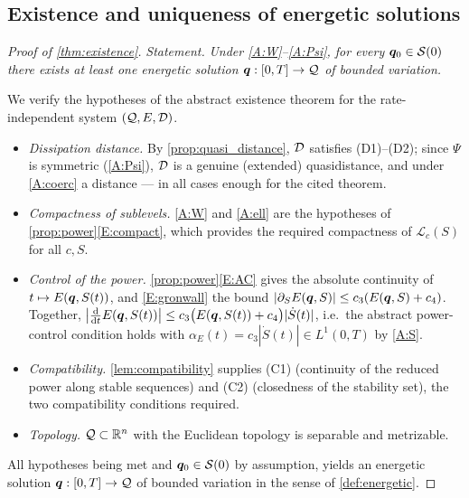 \subsection{Existence and uniqueness of energetic solutions}

\begin{proof}[Proof of \cref{thm:existence}]
\emph{Statement.} \emph{Under \ref{A:W}--\ref{A:Psi}, for every
$\bm{q}_0\in\mathcal S(0)$ there exists at least one energetic solution
$\bm{q}:[0,T]\to\mathcal{Q}$ of bounded variation.}

\smallskip
We verify the hypotheses of the abstract existence theorem
\cite[Thm.~2.1.6]{MielkeRoubicek} for the rate-independent system
$(\mathcal{Q},E,\mathcal{D})$.
\begin{itemize}[leftmargin=1.4em,itemsep=2pt]
  \item \emph{Dissipation distance.} By \cref{prop:quasi_distance},
  $\mathcal{D}$ satisfies (D1)--(D2); since $\Psi$ is symmetric (\ref{A:Psi}),
  $\mathcal{D}$ is a genuine (extended) quasidistance, and under \ref{A:coerc}
  a distance --- in all cases enough for the cited theorem.
  \item \emph{Compactness of sublevels.} \ref{A:W} and \ref{A:ell} are
  the hypotheses of \cref{prop:power}\ref{E:compact}, which provides
  the required compactness of $\mathcal L_c(S)$ for all $c,S$.
  \item \emph{Control of the power.} \cref{prop:power}\ref{E:AC}
  gives the absolute continuity of $t\mapsto E(\bm{q},S(t))$, and
  \ref{E:gronwall} the bound $|\partial_S E(\bm{q},S)|\le c_3(E(\bm{q},S)+c_4)$.
  Together, $\bigl|\tfrac{\mathop{}\!\mathrm{d}}{\mathop{}\!\mathrm{d} t}E(\bm{q},S(t))\bigr|\le c_3\bigl(E(\bm{q},S(t))+c_4\bigr)|\dot S(t)|$,
  i.e.\ the abstract power-control condition holds with
  $\alpha_E(t)=c_3|\dot S(t)|\in L^1(0,T)$ by \ref{A:S}.
  \item \emph{Compatibility.} \cref{lem:compatibility} supplies (C1)
  (continuity of the reduced power along stable sequences) and (C2)
  (closedness of the stability set), the two compatibility conditions
  required.
  \item \emph{Topology.} $\mathcal{Q}\subset\mathbb{R}^n$ with the Euclidean topology is
  separable and metrizable.
\end{itemize}
All hypotheses being met and $\bm{q}_0\in\mathcal S(0)$ by assumption,
\cite[Thm.~2.1.6]{MielkeRoubicek} yields an energetic solution
$\bm{q}:[0,T]\to\mathcal{Q}$ of bounded variation in the sense of
\cref{def:energetic}.
\end{proof}

